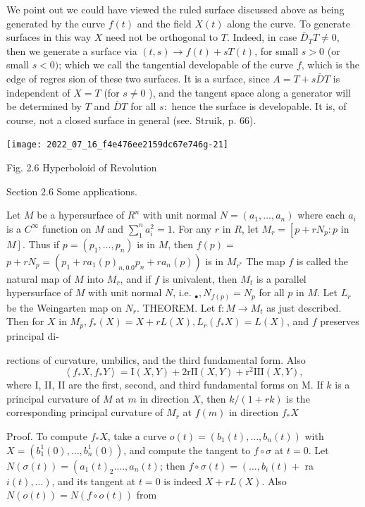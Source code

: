 \documentclass[10pt]{article}
\begin{document}
We point out we could have viewed the ruled surface discussed above as being generated by the curve $f(t)$ and the field $X(t)$ along the curve. To generate surfaces in this way $X$ need not be orthogonal to $T$. Indeed, in case $\bar{D}_{T} T \neq 0$, then we generate a surface via $(t, s) \rightarrow f(t)+s T(t)$, for small $s>0$ (or small $s<0)$; which we call the tangential developable of the curve $f$, which is the edge of regres sion of these two surfaces. It is a surface, since $A=T+s \bar{D} T$ is independent of $X=T$ (for $s \neq 0$ ), and the tangent space along a generator will be determined by $T$ and $\bar{D} T$ for all $s:$ hence the surface is developable. It is, of course, not a closed surface in general (see. Struik, p. 66).

\texttt{[image: 2022\_07\_16\_f4e476ee2159dc67e746g-21]}

Fig. 2.6 Hyperboloid of Revolution

Section $2.6$ Some applications.

Let $M$ be a hypersurface of $R^{n}$ with unit normal $N=\left(a_{1}, \ldots, a_{n}\right)$ where each $a_{i}$ is a $C^{\infty}$ function on $M$ and $\sum_{1}^{n} a_{i}^{2}=1$. For any $r$ in $R$, let $M_{r}=\left[p+r N_{p}: p\right.$ in $\left.M\right]$. Thus if $p=\left(p_{1}, \ldots, p_{n}\right)$ is in $M$, then $f(p)=$ $p+r N_{p}=\left(p_{1}+r a_{1}(p)_{n, 0.0} p_{n}+r a_{n}(p)\right)$ is in $M_{r^{*}}$ The map $f$ is called the natural map of $M$ into $M_{r}$, and if $f$ is univalent, then $M_{t}$ is a parallel hypersurface of $M$ with unit normal $N$, i.e. $_{\bullet}, N_{f(p)}=N_{p}$ for all $p$ in $M .$ Let $L_{r}$ be the Weingarten map on $N_{r} .$ THEOREM. Let $\mathrm{f}: M \rightarrow M_{t}$ as just described. Then for $X$ in $M_{p}, f_{*}(X)=X+r L(X), L_{r}\left(f_{*} X\right)=L(X)$, and $f$ preserves principal di-

rections of curvature, umbilics, and the third fundamental form. Also
$$
\left\langle f_{*} X, f_{*} Y\right\rangle=\mathrm{I}(X, Y)+2 \mathrm{r} \mathrm{II}(X, Y)+\mathrm{r}^{2} \mathrm{III}(X, Y),
$$
where I, II, II are the first, second, and third fundamental forms on M. If $k$ is a principal curvature of $M$ at $m$ in direction $X$, then $k /(1+r k)$ is the corresponding principal curvature of $M_{r}$ at $f(m)$ in direction $f_{*} X$

Proof. To compute $f_{*} X$, take a curve $o(t)=\left(b_{1}(t), \ldots, b_{n}(t)\right)$ with $X=\left(b_{1}^{1}(0), \ldots, b_{n}^{1}(0)\right)$, and compute the tangent to $f \circ \sigma$ at $t=0 .$ Let $N(\sigma(t))=\left(a_{1}(t)_{2} \ldots ., a_{n}(t)\right.$; then $f \circ \sigma(t)=\left(\ldots, b_{i}(t)+\right.$ ra $\left.i(t), \ldots\right)$, and its tangent at $t=0$ is indeed $X+r L(X) .$ Also $N(o(t))=N(f \circ o(t))$ from
\end{document}
